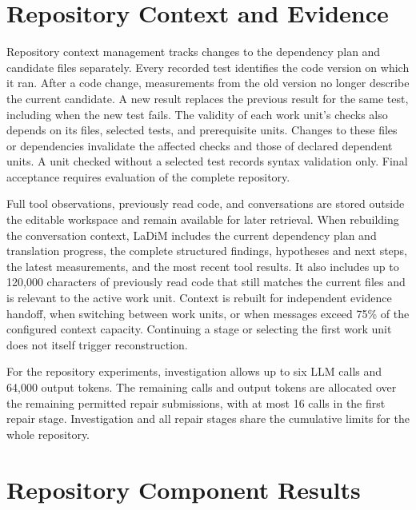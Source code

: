 \section{Repository Context and Evidence}
\label{sec:repository-context}
Repository context management tracks changes to the dependency plan and candidate files separately. Every recorded test identifies the code version on which it ran. After a code change, measurements from the old version no longer describe the current candidate. A new result replaces the previous result for the same test, including when the new test fails. The validity of each work unit's checks also depends on its files, selected tests, and prerequisite units. Changes to these files or dependencies invalidate the affected checks and those of declared dependent units. A unit checked without a selected test records syntax validation only. Final acceptance requires evaluation of the complete repository.

Full tool observations, previously read code, and conversations are stored outside the editable workspace and remain available for later retrieval. When rebuilding the conversation context, LaDiM includes the current dependency plan and translation progress, the complete structured findings, hypotheses and next steps, the latest measurements, and the most recent tool results. It also includes up to 120,000 characters of previously read code that still matches the current files and is relevant to the active work unit. Context is rebuilt for independent evidence handoff, when switching between work units, or when messages exceed 75\% of the configured context capacity. Continuing a stage or selecting the first work unit does not itself trigger reconstruction.

For the repository experiments, investigation allows up to six LLM calls and 64,000 output tokens. The remaining calls and output tokens are allocated over the remaining permitted repair submissions, with at most 16 calls in the first repair stage. Investigation and all repair stages share the cumulative limits for the whole repository.

\section{Repository Component Results}
\label{sec:repository-component-results}

